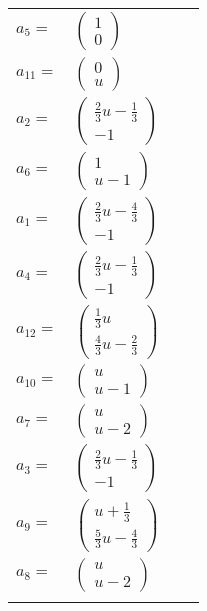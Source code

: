\documentclass[1p]{elsarticle_modified}
\theoremstyle{definition}
\begin{document}
\begin{tabular}{m{7pt} m{180pt} m{7pt} m{180pt} }
\flushright $a_{5}=$&$\begin{pmatrix}1\\0\end{pmatrix}$ \\
\flushright $a_{11}=$&$\begin{pmatrix}0\\u\end{pmatrix}$ \\
\flushright $a_{2}=$&$\begin{pmatrix}\frac{2}{3} u-\frac{1}{3}\\-1\end{pmatrix}$ \\
\flushright $a_{6}=$&$\begin{pmatrix}1\\u-1\end{pmatrix}$ \\
\flushright $a_{1}=$&$\begin{pmatrix}\frac{2}{3} u-\frac{4}{3}\\-1\end{pmatrix}$ \\
\flushright $a_{4}=$&$\begin{pmatrix}\frac{2}{3} u-\frac{1}{3}\\-1\end{pmatrix}$ \\
\flushright $a_{12}=$&$\begin{pmatrix}\frac{1}{3} u\\\frac{4}{3} u-\frac{2}{3}\end{pmatrix}$ \\
\flushright $a_{10}=$&$\begin{pmatrix}u\\u-1\end{pmatrix}$ \\
\flushright $a_{7}=$&$\begin{pmatrix}u\\u-2\end{pmatrix}$ \\
\flushright $a_{3}=$&$\begin{pmatrix}\frac{2}{3} u-\frac{1}{3}\\-1\end{pmatrix}$ \\
\flushright $a_{9}=$&$\begin{pmatrix}u+\frac{1}{3}\\\frac{5}{3} u-\frac{4}{3}\end{pmatrix}$ \\
\flushright $a_{8}=$&$\begin{pmatrix}u\\u-2\end{pmatrix}$\\&\end{tabular}
\end{document}
